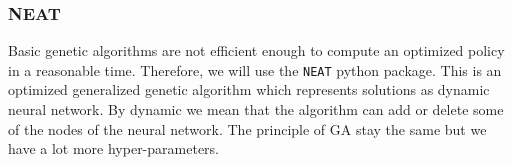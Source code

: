 \documentclass[11pt,a4paper]{article}
\newcommand{\tab}{\phantom{xxx}}
\newcommand{\mlist}[1]{\begin{itemize}[noitemsep,topsep=0pt]#1\end{itemize}}
\begin{document}
		
			\subsubsection*{NEAT}
Basic genetic algorithms are not efficient enough to compute an optimized policy in a reasonable time. 
Therefore, we will use the \texttt{NEAT} python package. 
This is an optimized generalized genetic algorithm which represents solutions as dynamic neural network. 
By dynamic we mean that the algorithm can add or delete some of the nodes of the neural network. 
The principle of GA stay the same but we have a lot more hyper-parameters.
	
\end{document}
